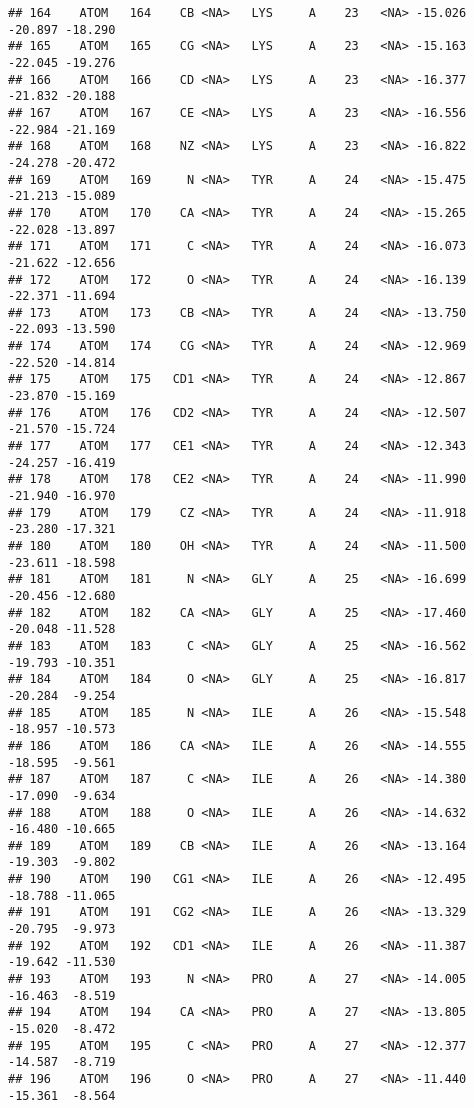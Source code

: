 \documentclass[
]{article}
\begin{document}
\begin{verbatim}
## 164    ATOM   164    CB <NA>   LYS     A    23   <NA> -15.026 -20.897 -18.290
## 165    ATOM   165    CG <NA>   LYS     A    23   <NA> -15.163 -22.045 -19.276
## 166    ATOM   166    CD <NA>   LYS     A    23   <NA> -16.377 -21.832 -20.188
## 167    ATOM   167    CE <NA>   LYS     A    23   <NA> -16.556 -22.984 -21.169
## 168    ATOM   168    NZ <NA>   LYS     A    23   <NA> -16.822 -24.278 -20.472
## 169    ATOM   169     N <NA>   TYR     A    24   <NA> -15.475 -21.213 -15.089
## 170    ATOM   170    CA <NA>   TYR     A    24   <NA> -15.265 -22.028 -13.897
## 171    ATOM   171     C <NA>   TYR     A    24   <NA> -16.073 -21.622 -12.656
## 172    ATOM   172     O <NA>   TYR     A    24   <NA> -16.139 -22.371 -11.694
## 173    ATOM   173    CB <NA>   TYR     A    24   <NA> -13.750 -22.093 -13.590
## 174    ATOM   174    CG <NA>   TYR     A    24   <NA> -12.969 -22.520 -14.814
## 175    ATOM   175   CD1 <NA>   TYR     A    24   <NA> -12.867 -23.870 -15.169
## 176    ATOM   176   CD2 <NA>   TYR     A    24   <NA> -12.507 -21.570 -15.724
## 177    ATOM   177   CE1 <NA>   TYR     A    24   <NA> -12.343 -24.257 -16.419
## 178    ATOM   178   CE2 <NA>   TYR     A    24   <NA> -11.990 -21.940 -16.970
## 179    ATOM   179    CZ <NA>   TYR     A    24   <NA> -11.918 -23.280 -17.321
## 180    ATOM   180    OH <NA>   TYR     A    24   <NA> -11.500 -23.611 -18.598
## 181    ATOM   181     N <NA>   GLY     A    25   <NA> -16.699 -20.456 -12.680
## 182    ATOM   182    CA <NA>   GLY     A    25   <NA> -17.460 -20.048 -11.528
## 183    ATOM   183     C <NA>   GLY     A    25   <NA> -16.562 -19.793 -10.351
## 184    ATOM   184     O <NA>   GLY     A    25   <NA> -16.817 -20.284  -9.254
## 185    ATOM   185     N <NA>   ILE     A    26   <NA> -15.548 -18.957 -10.573
## 186    ATOM   186    CA <NA>   ILE     A    26   <NA> -14.555 -18.595  -9.561
## 187    ATOM   187     C <NA>   ILE     A    26   <NA> -14.380 -17.090  -9.634
## 188    ATOM   188     O <NA>   ILE     A    26   <NA> -14.632 -16.480 -10.665
## 189    ATOM   189    CB <NA>   ILE     A    26   <NA> -13.164 -19.303  -9.802
## 190    ATOM   190   CG1 <NA>   ILE     A    26   <NA> -12.495 -18.788 -11.065
## 191    ATOM   191   CG2 <NA>   ILE     A    26   <NA> -13.329 -20.795  -9.973
## 192    ATOM   192   CD1 <NA>   ILE     A    26   <NA> -11.387 -19.642 -11.530
## 193    ATOM   193     N <NA>   PRO     A    27   <NA> -14.005 -16.463  -8.519
## 194    ATOM   194    CA <NA>   PRO     A    27   <NA> -13.805 -15.020  -8.472
## 195    ATOM   195     C <NA>   PRO     A    27   <NA> -12.377 -14.587  -8.719
## 196    ATOM   196     O <NA>   PRO     A    27   <NA> -11.440 -15.361  -8.564

\end{verbatim}
\end{document}

